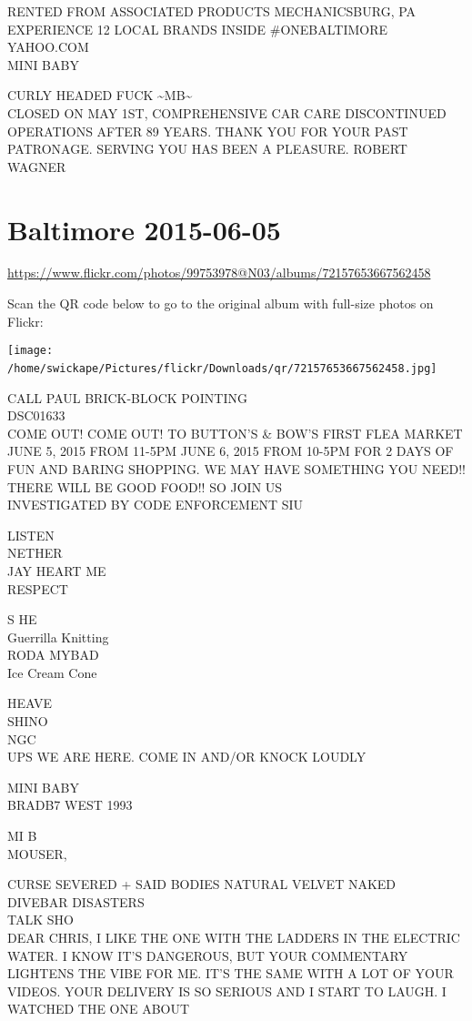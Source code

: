 \documentclass[10pt,letterpaper]{article}
\begin{document}
RENTED FROM ASSOCIATED PRODUCTS MECHANICSBURG, PA\\
EXPERIENCE 12 LOCAL BRANDS INSIDE \#ONEBALTIMORE\\
YAHOO.COM\\
MINI BABY

CURLY HEADED FUCK \textasciitilde{}MB\textasciitilde{}\\
CLOSED ON MAY 1ST, COMPREHENSIVE CAR CARE DISCONTINUED OPERATIONS AFTER 89 YEARS.  THANK YOU FOR YOUR PAST PATRONAGE.  SERVING YOU HAS BEEN A PLEASURE.  ROBERT WAGNER
\

\section*{Baltimore 2015-06-05}

\url{https://www.flickr.com/photos/99753978@N03/albums/72157653667562458}

Scan the QR code below to go to the original album with full-size photos on Flickr:

\texttt{[image: /home/swickape/Pictures/flickr/Downloads/qr/72157653667562458.jpg]}
\

CALL PAUL BRICK{-}BLOCK POINTING\\
DSC01633\\
COME OUT!  COME OUT!  TO BUTTON'S \& BOW'S FIRST FLEA MARKET JUNE 5, 2015 FROM 11{-}5PM JUNE 6, 2015 FROM 10{-}5PM FOR 2 DAYS OF FUN AND BARING SHOPPING.  WE MAY HAVE SOMETHING YOU NEED!! THERE WILL BE GOOD FOOD!! SO JOIN US\\
INVESTIGATED BY CODE ENFORCEMENT SIU

LISTEN\\
NETHER\\
JAY HEART ME\\
RESPECT

S HE\\
Guerrilla Knitting\\
RODA MYBAD\\
Ice Cream Cone

HEAVE\\
SHINO\\
NGC\\
UPS WE ARE HERE.  COME IN AND/OR KNOCK LOUDLY

MINI BABY\\
BRADB7 WEST 1993

MI B\\
MOUSER,

CURSE SEVERED  + SAID BODIES NATURAL VELVET NAKED\\
DIVEBAR DISASTERS\\
TALK SHO\\
DEAR CHRIS, I LIKE THE ONE WITH THE LADDERS IN THE ELECTRIC WATER.  I KNOW IT'S DANGEROUS, BUT YOUR COMMENTARY LIGHTENS THE VIBE FOR ME.  IT'S THE SAME WITH A LOT OF YOUR VIDEOS.  YOUR DELIVERY IS SO SERIOUS AND I START TO LAUGH.  I WATCHED THE ONE ABOUT
\end{document}
